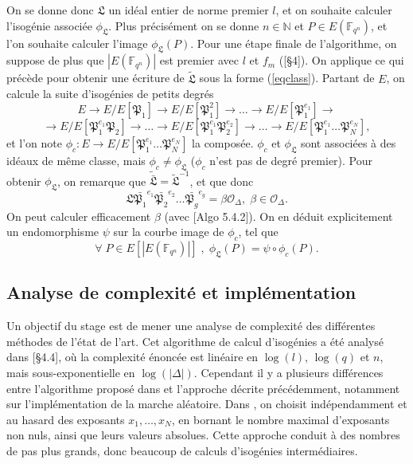 \documentclass{article}
\newcommand{\N}[0]{\mathbb{N}}
\newcommand{\OR}[0]{\mathcal{O}}
\newcommand{\LR}[0]{\mathfrak{L}}
\newcommand{\PR}[0]{\mathfrak{P}}
\newcommand{\CL}[0]{\tilde{\LR}}
\newcommand{\F}[0]{\mathbb{F}}
\theoremstyle{definition}
\theoremstyle{remark}
\begin{document}
	On se donne donc $\LR$ un idéal entier de norme premier $l$, et on souhaite calculer l'isogénie associée $\phi_\LR$. Plus précisément on se donne $n\in\N$ et $P\in E(\F_{q^{n}})$, et l'on souhaite calculer l'image $\phi_\LR(P)$. Pour une étape finale de l'algorithme, on suppose de plus que $|E(\F_{q^{n}})|$ est premier avec $l$ et $f_m$ (\cite{BrokerCharlesLauter}[\S 4]). On applique ce qui précède pour obtenir une écriture de $\CL$ sous la forme (\ref{eqclass}). Partant de $E$, on calcule la suite d'isogénies de petits degrés
	\begin{equation*}
		E\rightarrow E/E\left[ \PR_{1}\right] \rightarrow E/E\left[ \PR_{1}^{2}\right] \rightarrow\ldots\rightarrow E/E\left[ \PR_{1}^{e_{1}}\right] \rightarrow
	\end{equation*}
	\begin{equation*}
		\rightarrow E/E\left[ \PR_{1}^{e_{1}}\PR_{2}\right] \rightarrow\ldots\rightarrow E/E\left[ \PR_{1}^{e_{1}}\PR_{2}^{e_{2}}\right] \rightarrow\ldots\rightarrow E/E\left[\PR_{1}^{e_{1}} \ldots\PR_{N}^{e_{N}}\right],
	\end{equation*}
	et l'on note $\phi_c : E\rightarrow E/E\left[\PR_{1}^{e_{1}} \ldots\PR_{N}^{e_{N}}\right]$ la composée. $\phi_c$ et $\phi_\LR$ sont associées à des idéaux de même classe, mais $\phi_c \neq \phi_\LR$ ($\phi_c$ n'est pas de degré premier). Pour obtenir $\phi_\LR$, on remarque que $\widetilde{\bar{\LR}} = \tilde{\LR}^{-1}$, et que donc 
	\begin{equation*}
		\LR\bar{\PR_{1}}^{e_{1}}\bar{\PR_{2}}^{e_{2}}\ldots\bar{\PR_{g}}^{e_{g}} = \beta\OR_{\Delta},\;\beta\in\OR_\Delta.
	\end{equation*} 
	On peut calculer efficacement $\beta$ (avec \cite{Coh00}[Algo 5.4.2]). On en déduit explicitement un endomorphisme $\psi$ sur la courbe image de $\phi_c$, tel que
	\begin{equation*}
		\forall\; P\in E[|E(\F_{q^{n}})|]\;,\;\phi_\LR(P) = \psi\circ\phi_c(P).
	\end{equation*}

	
	\subsection{Analyse de complexité et implémentation}
	
	Un objectif du stage est de mener une analyse de complexité des différentes méthodes de l'état de l'art. Cet algorithme de calcul d'isogénies a été analysé dans \cite{JaoSoukharev}[\S 4.4], où la complexité énoncée est linéaire en $\log(l)$, $\log(q)$ et $n$, mais sous-exponentielle en $\log(|\Delta|)$. Cependant il y a plusieurs différences entre l'algorithme proposé dans \cite{JaoSoukharev} et l'approche décrite précédemment, notamment sur l'implémentation de la marche aléatoire. Dans \cite{JaoSoukharev}, on choisit indépendamment et au hasard des exposants $x_1,\ldots,x_N$, en bornant le nombre maximal d'exposants non nuls, ainsi que leurs valeurs absolues. Cette approche conduit à des nombres de pas plus grands, donc beaucoup de calculs d'isogénies intermédiaires.\\
	
\end{document}
